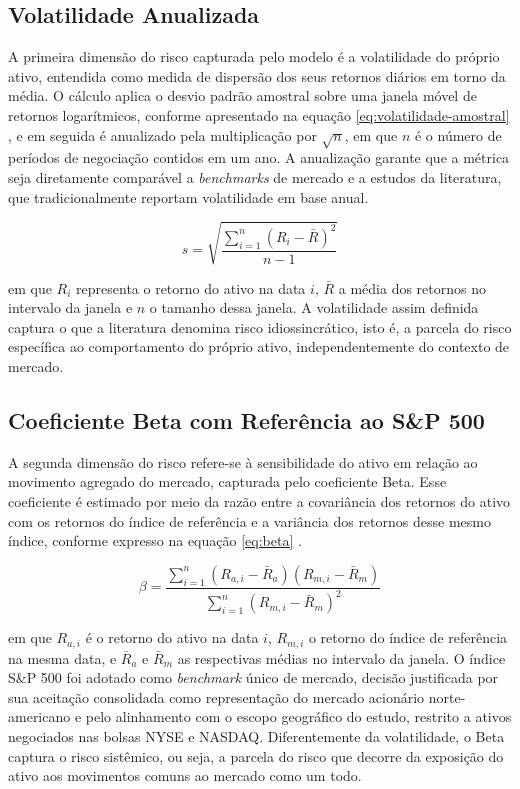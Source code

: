 \subsection{Volatilidade Anualizada}

A primeira dimensão do risco capturada pelo modelo é a volatilidade do próprio ativo, entendida como medida de dispersão dos seus retornos diários em torno da média. O cálculo aplica o desvio padrão amostral sobre uma janela móvel de retornos logarítmicos, conforme apresentado na equação \ref{eq:volatilidade-amostral} \cite{assaf_neto_mercado_2022}, e em seguida é anualizado pela multiplicação por \(\sqrt{n}\), em que \(n\) é o número de períodos de negociação contidos em um ano. A anualização garante que a métrica seja diretamente comparável a \textit{benchmarks} de mercado e a estudos da literatura, que tradicionalmente reportam volatilidade em base anual.

\begin{equation}
\label{eq:volatilidade-amostral}
s = \sqrt{\frac{\sum_{i=1}^{n} (R_i - \bar{R})^2}{n - 1}}
\end{equation}

\noindent em que \(R_i\) representa o retorno do ativo na data \(i\), \(\bar{R}\) a média dos retornos no intervalo da janela e \(n\) o tamanho dessa janela. A volatilidade assim definida captura o que a literatura denomina risco idiossincrático, isto é, a parcela do risco específica ao comportamento do próprio ativo, independentemente do contexto de mercado.

\subsection{Coeficiente Beta com Referência ao S\&P 500}

A segunda dimensão do risco refere-se à sensibilidade do ativo em relação ao movimento agregado do mercado, capturada pelo coeficiente Beta. Esse coeficiente é estimado por meio da razão entre a covariância dos retornos do ativo com os retornos do índice de referência e a variância dos retornos desse mesmo índice, conforme expresso na equação \ref{eq:beta} \cite{sharpe1964}.

\begin{equation}
\label{eq:beta}
\beta = \frac{\sum_{i=1}^{n} (R_{a,i} - \bar{R}_a)(R_{m,i} - \bar{R}_m)}{\sum_{i=1}^{n} (R_{m,i} - \bar{R}_m)^2}
\end{equation}

\noindent em que \(R_{a,i}\) é o retorno do ativo na data \(i\), \(R_{m,i}\) o retorno do índice de referência na mesma data, e \(\bar{R}_a\) e \(\bar{R}_m\) as respectivas médias no intervalo da janela. O índice S\&P 500 foi adotado como \textit{benchmark} único de mercado, decisão justificada por sua aceitação consolidada como representação do mercado acionário norte-americano e pelo alinhamento com o escopo geográfico do estudo, restrito a ativos negociados nas bolsas NYSE e NASDAQ. Diferentemente da volatilidade, o Beta captura o risco sistêmico, ou seja, a parcela do risco que decorre da exposição do ativo aos movimentos comuns ao mercado como um todo.

